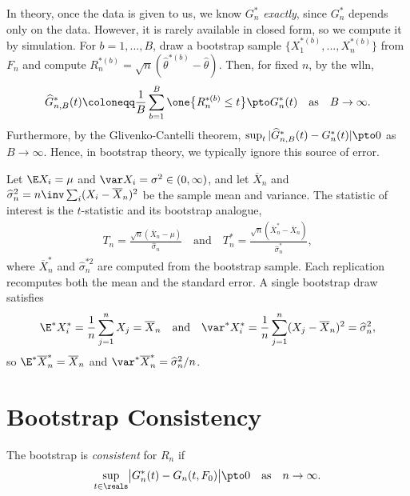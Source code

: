 \documentclass[a4paper,12pt]{article}
\begin{document}
\begin{remark}
	In theory, once the data is given to us, we know $G_n^*$ \emph{exactly},
	since $G_n^*$ depends only on the data.
	However, it is rarely available in closed form, so we compute it by simulation.
	For $b=1,...,B$, draw a bootstrap sample $\{X_1^{*(b)},...,X_n^{*(b)}\}$ from $F_n$ and compute $R_n^{*(b)}=\sqrt n(\widehat\theta^{*(b)}-\widehat\theta)$.
	Then, for fixed $n$, by the \gls{wlln},
	\begin{align}
		\widehat G_{n,B}^*(t)\coloneqq\frac1B\sum_{b=1}^B\one\bigl\{R_n^{*(b)}\le t\bigr\}\pto G_n^*(t)
		\quad\text{as}\quad
		B\to\infty.
	\end{align}
	Furthermore, by the Glivenko-Cantelli theorem, $\sup_t|\widehat G_{n,B}^*(t)-G_n^*(t)|\pto0$ as $B\to\infty$.
	Hence, in bootstrap theory, we typically ignore this source of error.
\end{remark}

\begin{example}\label{ex-mean}
	Let $\E X_i=\mu$ and $\var X_i=\sigma^2\in(0,\infty)$, and let $\overline X_n$ and $\widehat\sigma_n^2=n\inv\sum_i(X_i-\overline X_n)^2$ be the sample mean and variance.
	The statistic of interest is the $t$-statistic and its bootstrap analogue,
	\begin{align}
		T_n=\frac{\sqrt n(\overline X_n-\mu)}{\widehat\sigma_n}
		\quad\text{and}\quad
		T_n^*=\frac{\sqrt n(\overline X_n^*-\overline X_n)}{\widehat\sigma_n^*},
	\end{align}
	where $\overline X_n^*$ and $\widehat\sigma_n^{*2}$ are computed from the bootstrap sample.
	Each replication recomputes both the mean and the standard error.
	A single bootstrap draw satisfies
	\begin{align}
		\E^*X_i^*=\frac1n\sum_{j=1}^nX_j=\overline X_n
		\quad\text{and}\quad
		\var^*X_i^*=\frac1n\sum_{j=1}^n(X_j-\overline X_n)^2=\widehat\sigma_n^2,
	\end{align}
	so $\E^*\overline X_n^*=\overline X_n$ and $\var^*\overline X_n^*=\widehat\sigma_n^2/n$.
\end{example}

\section{Bootstrap Consistency}

\begin{definition}
	The bootstrap is \emph{consistent} for $R_n$ if
	\begin{align}
		\sup_{t\in\reals}\bigl|G_n^*(t)-G_n(t,F_0)\bigr|\pto0
		\quad\text{as}\quad
		n\to\infty.
	\end{align}
\end{definition}
\end{document}
